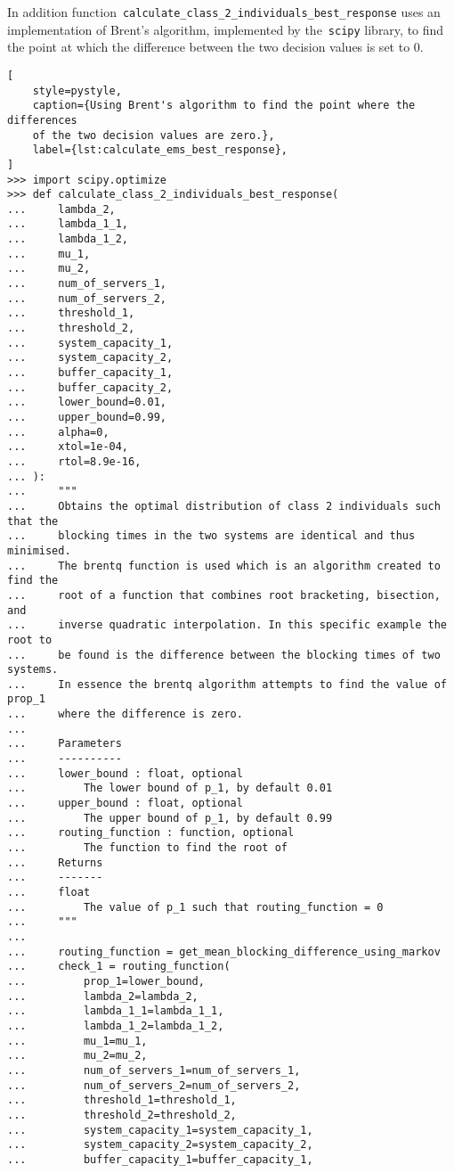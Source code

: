 In addition function~\texttt{calculate\_class\_2\_individuals\_best\_response}
uses
an implementation of Brent's algorithm, implemented by the~\texttt{scipy}
library, to find the point at which the
difference between the two decision values is set to 0.

\begin{lstlisting}[
    style=pystyle,
    caption={Using Brent's algorithm to find the point where the differences
    of the two decision values are zero.},
    label={lst:calculate_ems_best_response},
]
>>> import scipy.optimize
>>> def calculate_class_2_individuals_best_response(
...     lambda_2,
...     lambda_1_1,
...     lambda_1_2,
...     mu_1,
...     mu_2,
...     num_of_servers_1,
...     num_of_servers_2,
...     threshold_1,
...     threshold_2,
...     system_capacity_1,
...     system_capacity_2,
...     buffer_capacity_1,
...     buffer_capacity_2,
...     lower_bound=0.01,
...     upper_bound=0.99,
...     alpha=0,
...     xtol=1e-04,
...     rtol=8.9e-16,
... ):
...     """
...     Obtains the optimal distribution of class 2 individuals such that the
...     blocking times in the two systems are identical and thus minimised.
...     The brentq function is used which is an algorithm created to find the
...     root of a function that combines root bracketing, bisection, and
...     inverse quadratic interpolation. In this specific example the root to
...     be found is the difference between the blocking times of two systems.
...     In essence the brentq algorithm attempts to find the value of prop_1
...     where the difference is zero.
...
...     Parameters
...     ----------
...     lower_bound : float, optional
...         The lower bound of p_1, by default 0.01
...     upper_bound : float, optional
...         The upper bound of p_1, by default 0.99
...     routing_function : function, optional
...         The function to find the root of
...     Returns
...     -------
...     float
...         The value of p_1 such that routing_function = 0
...     """
...
...     routing_function = get_mean_blocking_difference_using_markov
...     check_1 = routing_function(
...         prop_1=lower_bound,
...         lambda_2=lambda_2,
...         lambda_1_1=lambda_1_1,
...         lambda_1_2=lambda_1_2,
...         mu_1=mu_1,
...         mu_2=mu_2,
...         num_of_servers_1=num_of_servers_1,
...         num_of_servers_2=num_of_servers_2,
...         threshold_1=threshold_1,
...         threshold_2=threshold_2,
...         system_capacity_1=system_capacity_1,
...         system_capacity_2=system_capacity_2,
...         buffer_capacity_1=buffer_capacity_1,

\end{lstlisting}
